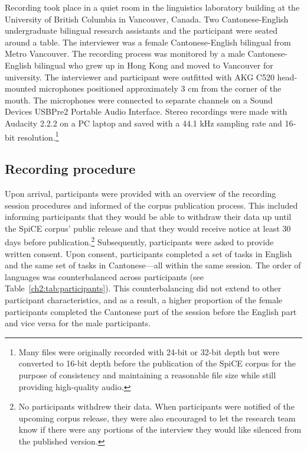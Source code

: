 Recording took place in a quiet room in the linguistics laboratory building at the University of British Columbia in Vancouver, Canada. Two Cantonese-English undergraduate bilingual research assistants and the participant were seated around a table. The interviewer was a female Cantonese-English bilingual from Metro Vancouver. The recording process was monitored by a male Cantonese-English bilingual who grew up in Hong Kong and moved to Vancouver for university. The interviewer and participant were outfitted with AKG C520 head-mounted microphones positioned approximately 3 cm from the corner of the mouth. The microphones were connected to separate channels on a Sound Devices USBPre2 Portable Audio Interface. Stereo recordings were made with Audacity 2.2.2 \citep{audacity_2018_audio} on a PC laptop and saved with a 44.1 kHz sampling rate and 16-bit resolution.\footnote{Many files were originally recorded with 24-bit or 32-bit depth but were converted to 16-bit depth before the publication of the SpiCE corpus for the purpose of consistency and maintaining a reasonable file size while still providing high-quality audio.}

\subsection{Recording procedure}\label{ch2:subsec:procedure}

Upon arrival, participants were provided with an overview of the recording session procedures and informed of the corpus publication process. This included informing participants that they would be able to withdraw their data up until the SpiCE corpus' public release and that they would receive notice at least 30 days before publication.\footnote{No participants withdrew their data. When participants were notified of the upcoming corpus release, they were also encouraged to let the research team know if there were any portions of the interview they would like silenced from the published version.} Subsequently, participants were asked to provide written consent. Upon consent, participants completed a set of tasks in English and the same set of tasks in Cantonese---all within the same session. The order of languages was counterbalanced across participants (see Table~\ref{ch2:tab:participants}). This counterbalancing did not extend to other participant characteristics, and as a result, a higher proportion of the female participants completed the Cantonese part of the session before the English part and vice versa for the male participants. 
 

